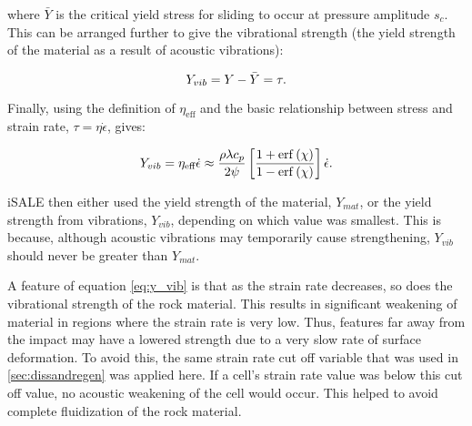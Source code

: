 where $\bar{Y}$ is the critical yield stress for sliding to occur at pressure amplitude $s_c$. This can be arranged further to give the vibrational strength (the yield strength of the material as a result of acoustic vibrations):

\begin{equation}
Y_{vib} = Y - \bar{Y} = \tau. \vspace{0.2cm}
\end{equation} 

Finally, using the definition of $\eta_{\text{eff}}$ \citep{collins2003acoustic} and the basic relationship between stress and strain rate, $\tau = \eta \dot{\epsilon}$, gives:

\begin{equation} \label{eq:y_vib}
Y_{vib} = \eta_{\text{eff}} \dot{\epsilon} \approx  \frac{\rho \lambda c_{p}}{2 \psi} \left[ \frac{1+\erf\left(\chi\right)}{1-\erf\left(\chi\right)} \right] \dot{\epsilon}.\vspace{0.2cm}
\end{equation} 

iSALE then either used the yield strength of the material, $Y_{mat}$, or the yield strength from vibrations, $Y_{vib}$, depending on which value was smallest. This is because, although acoustic vibrations may temporarily cause strengthening, $Y_{vib}$ should never be greater than $Y_{mat}$.

A feature of equation \ref{eq:y_vib} is that as the strain rate decreases, so does the vibrational strength of the rock material. This results in significant weakening of material  in regions where the strain rate is very low. Thus, features far away from the impact may have a lowered strength due to a very slow rate of surface deformation. To avoid this, the same strain rate cut off variable that was used in \ref{sec:dissandregen} was applied here. If a cell's strain rate value was below this cut off value, no acoustic weakening of the cell would occur. This helped to avoid complete fluidization of the rock material. 